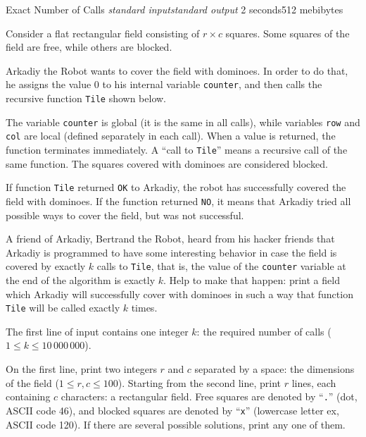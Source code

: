 \gdef\thisproblemorigin{190421, LIII SPbSU Championship}
\gdef\thisproblemauthor{Ivan Kazmenko}
\gdef\thisproblemdeveloper{Ivan Kazmenko}
\begin{problem}{Exact Number of Calls}
{\textsl{standard input}}{\textsl{standard output}}
{2 seconds}{512 mebibytes}{}

Consider a flat rectangular field consisting of $r \times c$ squares.
Some squares of the field are free, while others are blocked.

Arkadiy the Robot wants to cover the field with dominoes.
In order to do that, he assigns the value $0$ to his internal variable
\texttt{counter}, and then calls the recursive function \texttt{Tile}
shown below.



The variable \texttt{counter} is global
(it is the same in all calls),
while variables \texttt{row} and \texttt{col} are local
(defined separately in each call).
When a value is returned, the function terminates immediately.
A ``call to \texttt{Tile}'' means a recursive call of the same function.
The squares covered with dominoes are considered blocked.

If function \texttt{Tile} returned \texttt{OK} to Arkadiy,
the robot has successfully covered the field with dominoes.
If the function returned \texttt{NO}, it means that Arkadiy
tried all possible ways to cover the field, but was not successful.

A friend of Arkadiy, Bertrand the Robot, heard from his hacker friends
that Arkadiy is programmed to have some interesting behavior
in case the field is covered by exactly $k$ calls to \texttt{Tile},
that is, the value of the \texttt{counter} variable at the end
of the algorithm is exactly $k$.
Help to make that happen: print a field which Arkadiy will successfully cover
with dominoes in such a way that function \texttt{Tile} will be called
exactly $k$ times.

\InputFile

The first line of input contains one integer $k$:
the required number of calls
($1 \le k \le 10\,000\,000$).

\OutputFile

On the first line, print two integers $r$ and $c$ separated by a space:
the dimensions of the field
($1 \le r, c \le 100$).
Starting from the second line, print $r$ lines, each containing $c$ characters:
a rectangular field.
Free squares are denoted by ``\texttt{.}'' (dot, ASCII code 46),
and blocked squares are denoted by ``\texttt{x}''
(lowercase letter ex, ASCII code 120).
If there are several possible solutions, print any one of them.

\Examples

\begin{example}
\exmp{%
%
}{%
%
}%
\exmp{%
%
}{%
%
}%
\end{example}

\end{problem}
